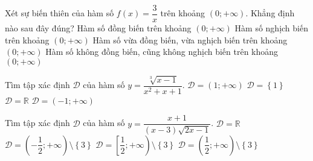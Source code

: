 \begin{ex}%
    Xét sự biến thiên của hàm số $f(x)=\dfrac{3}{x}$ trên khoảng $(0;+\infty)$. Khẳng định nào sau đây đúng?
    \choice
    {Hàm số đồng biến trên khoảng $\left(0;+\infty \right)$}
    {\True Hàm số nghịch biến trên khoảng $\left(0;+\infty \right)$}
    {Hàm số vừa đồng biến, vừa nghịch biến trên khoảng $\left(0;+\infty \right)$}
    {Hàm số không đồng biến, cũng không nghịch biến trên khoảng $\left(0;+\infty \right)$}
\end{ex}

\begin{ex}%
    Tìm tập xác định $\mathscr{D}$ của hàm số $y=\dfrac{\sqrt[3]{x-1}}{x^2+x+1}$.
    \choice
    {$\mathscr{D}=\left(1;+\infty \right)$}
    {$\mathscr{D}=\left\{1\right\}$}
    {\True $\mathscr{D}=\mathbb{R}$}
    {$\mathscr{D}=\left(-1;+\infty \right)$}
\end{ex}

\begin{ex}%
    Tìm tập xác định $\mathscr{D}$ của hàm số $y=\dfrac{x+1}{(x-3)\sqrt{2x-1}}$.
    \choice
    {$\mathscr{D}=\mathbb{R}$}
    {$\mathscr{D}=\left(-\dfrac{1}{2};+\infty \right)\setminus\left\{3\right\}$}
    {$\mathscr{D}=\left[\dfrac{1}{2};+\infty \right)\setminus\left\{3\right\}$}
    {\True $\mathscr{D}=\left(\dfrac{1}{2};+\infty \right)\setminus\left\{3\right\}$}
\end{ex}

